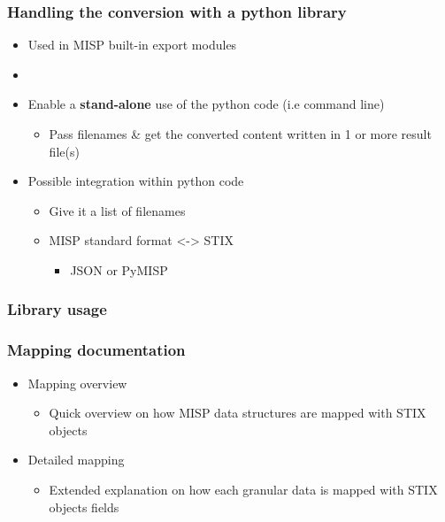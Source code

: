 \begin{frame}
    \frametitle{Handling the conversion with a python library}
    \begin{itemize}
        \item Used in MISP built-in export modules
        \item []
        \item Enable a {\bf stand-alone} use of the python code (i.e command line)
        \begin{itemize}
            \item Pass filenames \& get the converted content written in 1 or more result file(s)
        \end{itemize}
        \item Possible integration within python code
        \begin{itemize}
            \item Give it a list of filenames
            \item MISP standard format <-> STIX
            \begin{itemize}
                \item JSON or PyMISP
            \end{itemize}
        \end{itemize}
    \end{itemize}
\end{frame}

\begin{frame}
    \frametitle{Library usage}
\end{frame}

\begin{frame}
    \frametitle{Mapping documentation}
    \begin{itemize}
        \item Mapping overview
        \begin{itemize}
            \item Quick overview on how MISP data structures are mapped with STIX objects
        \end{itemize}
        \item Detailed mapping
        \begin{itemize}
            \item Extended explanation on how each granular data is mapped with STIX objects fields
        \end{itemize}
    \end{itemize}
\end{frame}

